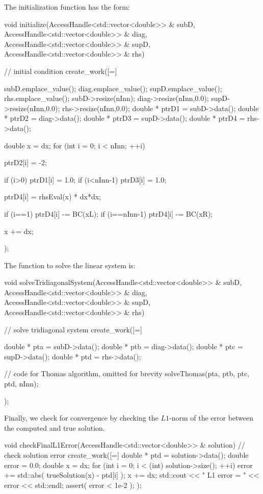 The initialization function has the form:
\begin{CppCodeNumb}
void initialize(AccessHandle<std::vector<double>> & subD,
                AccessHandle<std::vector<double>> & diag, 
                AccessHandle<std::vector<double>> & supD,
                AccessHandle<std::vector<double>> & rhs)
{
  // initial condition
  create_work([=]
  {
    subD.emplace_value();
    diag.emplace_value();
    supD.emplace_value();
    rhs.emplace_value();
    subD->resize(nInn);
    diag->resize(nInn,0.0);
    supD->resize(nInn,0.0);
    rhs->resize(nInn,0.0);
    double * ptrD1 = subD->data();
    double * ptrD2 = diag->data();
    double * ptrD3 = supD->data();
    double * ptrD4 = rhs->data();

    double x = dx;
    for (int i = 0; i < nInn; ++i)
    {
      ptrD2[i] = -2;

      if (i>0)
        ptrD1[i] = 1.0;
      if (i<nInn-1)
        ptrD3[i] = 1.0;

      ptrD4[i] = rhsEval(x) * dx*dx;

      if (i==1)
        ptrD4[i] -= BC(xL);
      if (i==nInn-1)
        ptrD4[i] -= BC(xR);

      x += dx;
    }
  }); 
}
\end{CppCodeNumb}


The function to solve the linear system is:
\begin{CppCodeNumb}
void solveTridiagonalSystem(AccessHandle<std::vector<double>> & subD,
                            AccessHandle<std::vector<double>> & diag, 
                            AccessHandle<std::vector<double>> & supD,
                            AccessHandle<std::vector<double>> & rhs)
{
  // solve tridiagonal system
  create_work([=]
  {
    double * pta = subD->data();
    double * ptb = diag->data();
    double * ptc = supD->data();
    double * ptd = rhs->data();

    // code for Thomas algorithm, omitted for brevity
    solveThomas(pta, ptb, ptc, ptd, nInn);
  });
}
\end{CppCodeNumb}


Finally, we check for convergence by checking the $L1$-norm of the 
error between the computed and true solution.
\begin{CppCodeNumb}
void checkFinalL1Error(AccessHandle<std::vector<double>> & solution)
{
  // check solution error 
  create_work([=]
  {
    double * ptd = solution->data();
    double error = 0.0;
    double x = dx;
    for (int i = 0; i < (int) solution->size(); ++i)
    {
      error += std::abs( trueSolution(x) - ptd[i] );
      x += dx;
    }
    std::cout << " L1 error = " << error << std::endl;
    assert( error < 1e-2 );
  });
}
\end{CppCodeNumb}














